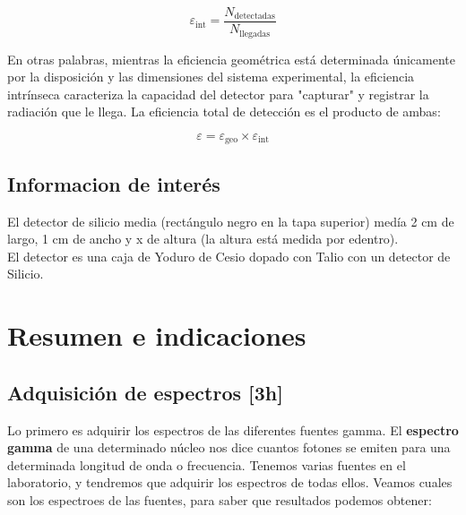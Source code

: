 \documentclass[11pt]{article}
\begin{document}
\begin{equation}
    \varepsilon_{\text{int}} = \frac{N_{\text{detectadas}}}{N_{\text{llegadas}}} 
\end{equation}

En otras palabras, mientras la eficiencia geométrica está determinada únicamente por la disposición y las dimensiones del sistema experimental, la eficiencia intrínseca caracteriza la capacidad del detector para "capturar" y registrar la radiación que le llega. La eficiencia total de detección es el producto de ambas:

\begin{equation}
    \varepsilon=\varepsilon_{\text{geo}} \times \varepsilon_{\text{int}}
\end{equation}

\subsection{Informacion de interés}

El detector de silicio media (rectángulo negro en la tapa superior) medía 2 cm de largo, 1 cm de ancho y x de altura (la altura está medida por edentro). \\


El detector es una caja de Yoduro de Cesio dopado con Talio con un detector de Silicio. 




\newpage

\section{Resumen e indicaciones}

\subsection{Adquisición de espectros [3h]}

Lo primero es adquirir los espectros de las diferentes fuentes gamma. El \textbf{espectro gamma} de una determinado núcleo nos dice cuantos fotones se emiten para una determinada longitud de onda o frecuencia. Tenemos varias fuentes en el laboratorio, y tendremos que adquirir los espectros de todas ellos. Veamos cuales son los espectroes de las fuentes, para saber que resultados podemos obtener: 
\end{document}
